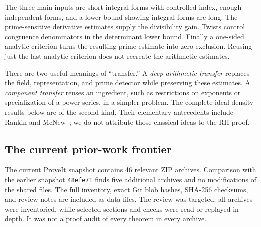 The three main inputs are short integral forms with controlled index,
enough independent forms, and a lower bound showing integral forms
are long. The prime-sensitive derivative estimates supply the
divisibility gain. Twists control congruence denominators in the
determinant lower bound. Finally a one-sided analytic criterion turns
the resulting prime estimate into zero exclusion. Reusing just the
last analytic criterion does not recreate the arithmetic estimates.

There are two useful meanings of ``transfer.'' A \emph{deep arithmetic
transfer} replaces the field, representation, and prime detector while
preserving these estimates. A \emph{component transfer} reuses an
ingredient, such as restrictions on exponents or specialization of a
power series, in a simpler problem. The complete ideal-density
results below are of the second kind. Their elementary antecedents
include Rankin and McNew~\cite{mcnew}; we do not attribute those classical ideas
to the RH proof.

\subsection{The current prior-work frontier}

The current ProveIt snapshot contains 46 relevant ZIP archives.
Comparison with the earlier snapshot \texttt{48efe71} finds five
additional archives and no modifications of the shared files. The
full inventory, exact Git blob hashes, SHA-256 checksums, and review
notes are included as data files. The review was targeted: all
archives were inventoried, while selected sections and checks were
read or replayed in depth. It was not a proof audit of every theorem
in every archive.

